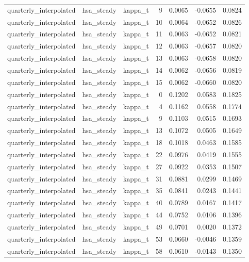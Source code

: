 \begin{tabular}{lllrrrr}
quarterly\_interpolated & hsa\_steady & kappa\_t & 9 & 0.0065 & -0.0655 & 0.0824 \\
quarterly\_interpolated & hsa\_steady & kappa\_t & 10 & 0.0064 & -0.0652 & 0.0826 \\
quarterly\_interpolated & hsa\_steady & kappa\_t & 11 & 0.0063 & -0.0652 & 0.0821 \\
quarterly\_interpolated & hsa\_steady & kappa\_t & 12 & 0.0063 & -0.0657 & 0.0820 \\
quarterly\_interpolated & hsa\_steady & kappa\_t & 13 & 0.0063 & -0.0658 & 0.0820 \\
quarterly\_interpolated & hsa\_steady & kappa\_t & 14 & 0.0062 & -0.0656 & 0.0819 \\
quarterly\_interpolated & hsa\_steady & kappa\_t & 15 & 0.0062 & -0.0660 & 0.0820 \\
quarterly\_interpolated & hsa\_steady & kappa\_t & 0 & 0.1202 & 0.0583 & 0.1825 \\
quarterly\_interpolated & hsa\_steady & kappa\_t & 4 & 0.1162 & 0.0558 & 0.1774 \\
quarterly\_interpolated & hsa\_steady & kappa\_t & 9 & 0.1103 & 0.0515 & 0.1693 \\
quarterly\_interpolated & hsa\_steady & kappa\_t & 13 & 0.1072 & 0.0505 & 0.1649 \\
quarterly\_interpolated & hsa\_steady & kappa\_t & 18 & 0.1018 & 0.0463 & 0.1585 \\
quarterly\_interpolated & hsa\_steady & kappa\_t & 22 & 0.0976 & 0.0419 & 0.1555 \\
quarterly\_interpolated & hsa\_steady & kappa\_t & 27 & 0.0922 & 0.0353 & 0.1507 \\
quarterly\_interpolated & hsa\_steady & kappa\_t & 31 & 0.0881 & 0.0299 & 0.1469 \\
quarterly\_interpolated & hsa\_steady & kappa\_t & 35 & 0.0841 & 0.0243 & 0.1441 \\
quarterly\_interpolated & hsa\_steady & kappa\_t & 40 & 0.0789 & 0.0167 & 0.1417 \\
quarterly\_interpolated & hsa\_steady & kappa\_t & 44 & 0.0752 & 0.0106 & 0.1396 \\
quarterly\_interpolated & hsa\_steady & kappa\_t & 49 & 0.0701 & 0.0020 & 0.1372 \\
quarterly\_interpolated & hsa\_steady & kappa\_t & 53 & 0.0660 & -0.0046 & 0.1359 \\
quarterly\_interpolated & hsa\_steady & kappa\_t & 58 & 0.0610 & -0.0143 & 0.1350 \\

\end{tabular}
